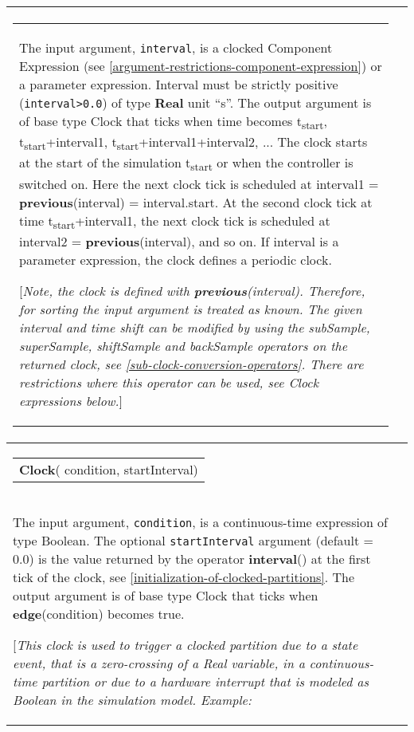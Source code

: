 \begin{longtable}[]{|p{3cm}|p{12cm}|}
\begin{tabular}{@{}p{119mm}@{}}
The input argument, \lstinline!interval!, is a clocked Component Expression (see
\autoref{argument-restrictions-component-expression}) or a parameter expression.
Interval must be strictly positive (\lstinline!interval>0.0!) of type \textbf{Real} unit ``s''. 
The output argument is of base type Clock that
ticks when time becomes t\textsubscript{start},
t\textsubscript{start}+interval1,
t\textsubscript{start}+interval1+interval2, ... The clock starts at the
start of the simulation t\textsubscript{start} or when the controller is
switched on. Here the next clock tick is scheduled at interval1 =
\textbf{previous}(interval) = interval.start. At the second clock tick
at time t\textsubscript{start}+interval1, the next clock tick is
scheduled at interval2 = \textbf{previous}(interval), and so on. If
interval is a parameter expression, the clock defines a periodic clock.

{[}\emph{Note, the clock is defined with \textbf{previous}(interval).
Therefore, for sorting the input argument is treated as known.}
\emph{The given interval and time shift can be modified by using the
subSample, superSample, shiftSample and backSample operators on the
returned clock, see \autoref{sub-clock-conversion-operators}. There are restrictions where
this operator can be used, see Clock expressions below.}{]}
\end{tabular}\\ \hline
\begin{tabular}{@{}p{29mm}@{}}
\textbf{Clock}(\newline
  condition,\newline
  startInterval)
\end{tabular}
&
\begin{tabular}{@{}p{119mm}@{}}
\textbf{Clock with Boolean Condition}\\

The input argument, \lstinline!condition!, is a continuous-time expression of type
Boolean. The optional \lstinline!startInterval! argument (default = 0.0) is the
value returned by the operator \textbf{interval}() at the first tick of
the clock, see \autoref{initialization-of-clocked-partitions}. The output argument is of base type Clock
that ticks when \textbf{edge}(condition) becomes true.

{[}\emph{This clock is used to trigger a clocked partition due to a
state event, that is a zero-crossing of a Real variable, in a
continuous-time partition or due to a hardware interrupt that is modeled
as Boolean in the simulation model. Example:}


\end{tabular}
\end{longtable}
